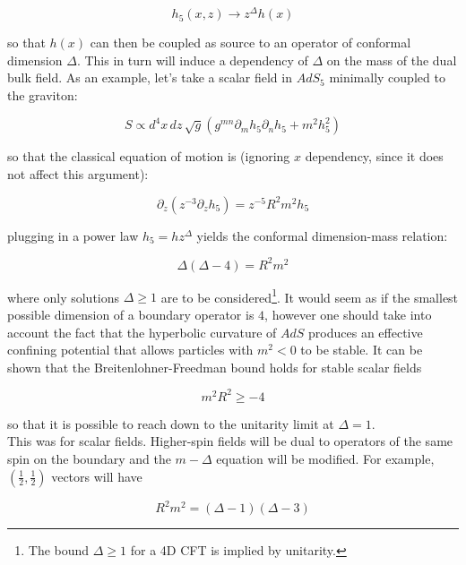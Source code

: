 \begin{equation}
	h_5(x,z) \rightarrow z^\Delta h(x)
	\label{}
\end{equation}

so that $h(x)$ can then be coupled as source to an operator of conformal dimension $\Delta$. This in turn will induce a dependency of $\Delta$ on the mass of the dual bulk field. As an example, let's take a scalar field in $AdS_5$ minimally coupled to the graviton:

\begin{equation}
	S \propto d^4 x\, dz \, \sqrt g \left( g^{mn} \partial_m h_5 \partial_n h_5 + m^2 h_5^2 \right)
	\label{}
\end{equation}

so that the classical equation of motion is (ignoring $x$ dependency, since it does not affect this argument):

\begin{equation}
	\partial_z \left( z^{-3} \partial_z h_5 \right) = z^{-5} R^2 m^2 h_5
	\label{ }
\end{equation}

plugging in a power law $h_5 = h z^\Delta$ yields the conformal dimension-mass relation:

\begin{equation}
	\Delta (\Delta-4) = R^2 m^2
	\label{}
\end{equation}

where only solutions $\Delta \geq 1$ are to be considered\footnote{The bound $\Delta \geq 1$ for a 4D CFT is implied by unitarity.}. It would seem as if the smallest possible dimension of a boundary operator is $4$, however one should take into account the fact that the hyperbolic curvature of $AdS$ produces an effective confining potential that allows particles with $m^2 < 0$ to be stable. It can be shown that the Breitenlohner-Freedman bound holds for stable scalar fields

\begin{equation}
	m^2 R^2 \geq - 4
	\label{}
\end{equation}

so that it is possible to reach down to the unitarity limit at $\Delta = 1$.\\

This was for scalar fields. Higher-spin fields will be dual to operators of the same spin on the boundary and the $m-\Delta$ equation will be modified. For example, $(\frac{1}{2},\frac{1}{2})$ vectors will have

\begin{equation}
	R^2 m^2 = (\Delta-1)(\Delta-3)
	\label{}
\end{equation}

